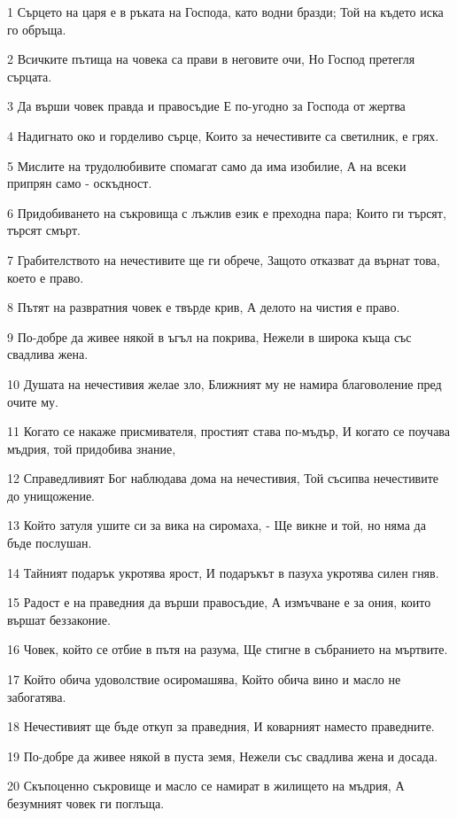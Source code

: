 \par 1 Сърцето на царя е в ръката на Господа, като водни бразди; Той на където иска го обръща.
\par 2 Всичките пътища на човека са прави в неговите очи, Но Господ претегля сърцата.
\par 3 Да върши човек правда и правосъдие Е по-угодно за Господа от жертва
\par 4 Надигнато око и горделиво сърце, Които за нечестивите са светилник, е грях.
\par 5 Мислите на трудолюбивите спомагат само да има изобилие, А на всеки припрян само - оскъдност.
\par 6 Придобиването на съкровища с лъжлив език е преходна пара; Които ги търсят, търсят смърт.
\par 7 Грабителството на нечестивите ще ги обрече, Защото отказват да върнат това, което е право.
\par 8 Пътят на развратния човек е твърде крив, А делото на чистия е право.
\par 9 По-добре да живее някой в ъгъл на покрива, Нежели в широка къща със свадлива жена.
\par 10 Душата на нечестивия желае зло, Ближният му не намира благоволение пред очите му.
\par 11 Когато се накаже присмивателя, простият става по-мъдър, И когато се поучава мъдрия, той придобива знание,
\par 12 Справедливият Бог наблюдава дома на нечестивия, Той съсипва нечестивите до унищожение.
\par 13 Който затуля ушите си за вика на сиромаха, - Ще викне и той, но няма да бъде послушан.
\par 14 Тайният подарък укротява ярост, И подаръкът в пазуха укротява силен гняв.
\par 15 Радост е на праведния да върши правосъдие, А измъчване е за ония, които вършат беззаконие.
\par 16 Човек, който се отбие в пътя на разума, Ще стигне в събранието на мъртвите.
\par 17 Който обича удоволствие осиромашява, Който обича вино и масло не забогатява.
\par 18 Нечестивият ще бъде откуп за праведния, И коварният наместо праведните.
\par 19 По-добре да живее някой в пуста земя, Нежели със свадлива жена и досада.
\par 20 Скъпоценно съкровище и масло се намират в жилището на мъдрия, А безумният човек ги поглъща.
